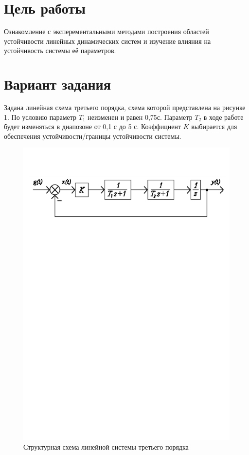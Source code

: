 \documentclass[a4paper, 11pt, russian]{article}
\begin{document}
    
    \section*{Цель работы}
    Ознакомление с эксперементальными методами построения областей устойчивости линейных динамических систем и изучение влияния на устойчивость системы её параметров.
    \section*{Вариант задания}
    Задана линейная схема третьего порядка, схема которой представлена на рисунке 1. По условию параметр $T_1$ неизменен и равен 0,75с. Параметр $T_2$ в ходе работе будет изменяться в диапозоне от 0,1 с до 5 с. Коэффициент $K$ выбирается для обеспечения устойчивости/границы устойчивости системы.
    \begin{figure}[h!]
        \centering
        \includegraphics[scale = 0.8]{structureScheme}
        \caption{Структурная схема линейной системы третьего порядка}
    \end{figure}
    
\end{document}
